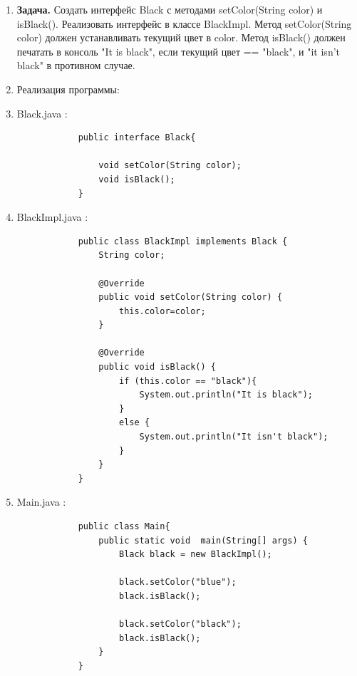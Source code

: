 \documentclass[a4paper]{article}
\begin{document}
    \begin{enumerate}
        \item \textbf{Задача.} Создать интерфейс Black с методами setColor(String color) и isBlack(). Реализовать интерфейс в классе BlackImpl. Метод setColor(String color) должен устанавливать текущий цвет в color.
         Метод isBlack() должен печатать в консоль "It is black", если текущий цвет == "black", и "it isn't black"  в противном случае.
        \item Реализация программы:
        \item Black.java :
        
        \begin{lstlisting}
            public interface Black{

                void setColor(String color);
                void isBlack();
            }
        \end{lstlisting}

        \item BlackImpl.java :
        
        \begin{lstlisting}
            public class BlackImpl implements Black {
                String color;

                @Override
                public void setColor(String color) {
                    this.color=color;
                }

                @Override
                public void isBlack() {
                    if (this.color == "black"){
                        System.out.println("It is black");
                    }
                    else {
                        System.out.println("It isn't black");
                    }
                }
            }
        \end{lstlisting}

        \item Main.java :
        
        \begin{lstlisting}
            public class Main{
                public static void  main(String[] args) {
                    Black black = new BlackImpl();
                    
                    black.setColor("blue");
                    black.isBlack();

                    black.setColor("black");
                    black.isBlack();
                }
            }
        \end{lstlisting}
        

\end{enumerate}
\end{document}
